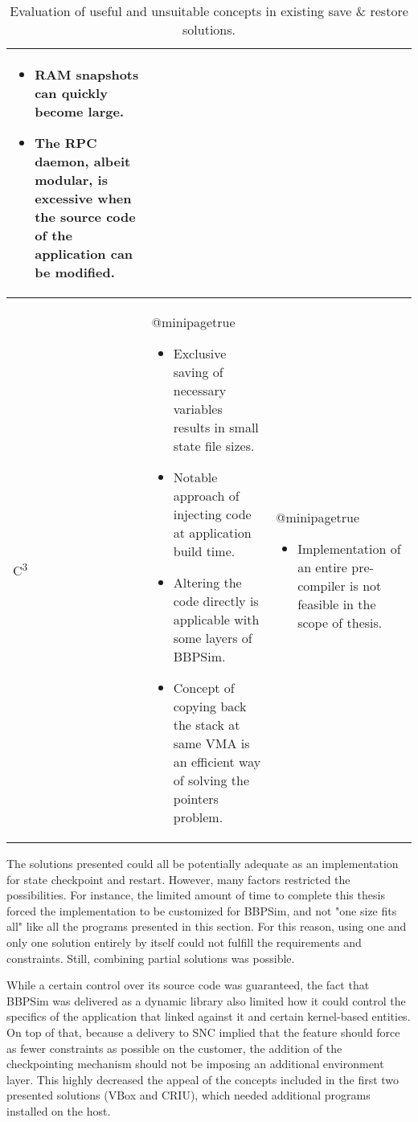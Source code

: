 {\begin{table}[htbp]
\begin{tabularx}{\linewidth}{l X X}
\begin{itemize}[leftmargin=*]
			\item RAM snapshots can quickly become large.
			\item The RPC daemon, albeit modular, is excessive when the source code of the application can be modified.
		\end{itemize}\\
		\midrule
		C\textsuperscript{3} & 
		\csname @minipagetrue\endcsname 
		\begin{itemize}[leftmargin=*]
			\item Exclusive saving of necessary variables results in small state file sizes.
			\item Notable approach of injecting code at application build time.
			\item Altering the code directly is applicable with some layers of BBPSim.
			\item Concept of copying back the stack at same \gls{VMA} is an efficient way of solving the pointers problem.
		\end{itemize} & 
		\csname @minipagetrue\endcsname 
		\begin{itemize}[leftmargin=*]
			\item Implementation of an entire pre-compiler is not feasible in the scope of thesis.
		\end{itemize}\\
		\bottomrule
	\end{tabularx}
	\caption{Evaluation of useful and unsuitable concepts in existing save \& restore solutions.}
	\label{tab:solutions-summary}
\end{table}

The solutions presented could all be potentially adequate as an implementation for state checkpoint and restart. However, many factors restricted the possibilities. For instance, the limited amount of time to complete this thesis forced the implementation to be customized for \gls{BBPSim}, and not "one size fits all" like all the programs presented in this section. For this reason, using one and only one solution entirely by itself could not fulfill the requirements and constraints. Still, combining partial solutions was possible.

While a certain control over its source code was guaranteed, the fact that BBPSim was delivered as a dynamic library also limited how it could control the specifics of the application that linked against it and certain kernel-based entities. On top of that, because a delivery to \gls{SNC} implied that the feature should force as fewer constraints as possible on the customer, the addition of the checkpointing mechanism should not be imposing an additional environment layer. This highly decreased the appeal of the concepts included in the first two presented solutions (VBox and CRIU), which needed additional programs installed on the host.

}
